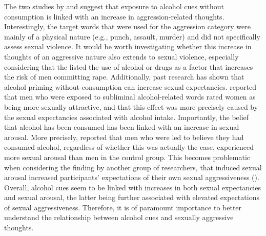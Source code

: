 \documentclass[serif, authorddate, twocolumn, empirical]{jote-article}
\begin{document}
The two studies by \textcite{BartholowHeinz2006} and \textcite{SubraMullerBegueLBushmanDelmas2010} suggest that exposure to alcohol cues without consumption is linked with an increase in aggression-related thoughts. Interestingly, the target words that were used for the aggression category were mainly of a physical nature (e.g., punch, assault, murder) and did not specifically assess sexual violence. It would be worth investigating whether this increase in thoughts of an aggressive nature also extends to sexual violence, especially considering that the \textcite{WHOSex} listed the use of alcohol or drugs as a factor that increases the risk of men committing rape. Additionally, past research has shown that alcohol priming without consumption can increase sexual expectancies. \textcite{FriedmanMcCarthyForsterJDenzler2005} reported that men who were exposed to subliminal alcohol-related words rated women as being more sexually attractive, and that this effect was more precisely caused by the sexual expectancies associated with alcohol intake. Importantly, the belief that alcohol has been consumed has been linked with an increase in sexual arousal. More precisely, \textcite{AbbeyMcAuslanZawackiClintonBuck2001} reported that men who were led to believe they had consumed alcohol, regardless of whether this was actually the case, experienced more sexual arousal than men in the control group. This becomes problematic when considering the finding by another group of researchers, that induced sexual arousal increased participants’ expectations of their own sexual aggressiveness (\cite{LoewensteinNaginPaternoster1997}). Overall, alcohol cues seem to be linked with increases in both sexual expectancies and sexual arousal, the latter being further associated with elevated expectations of sexual aggressiveness. Therefore, it is of paramount importance to better understand the relationship between alcohol cues and sexually aggressive thoughts.
\end{document}
